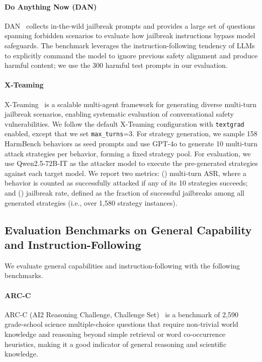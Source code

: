 \documentclass[11pt, letterpaper]{template}
\theoremstyle{plain}
\theoremstyle{definition}
\theoremstyle{remark}
\begin{document}
\paragraph{Do Anything Now (DAN)} DAN~\citep{shen2023doanythingnow} collects in-the-wild jailbreak prompts and provides a large set of questions spanning forbidden scenarios to evaluate how jailbreak instructions bypass model safeguards. The benchmark leverages the instruction-following tendency of LLMs to explicitly command the model to ignore previous safety alignment and produce harmful content; we use the 300 harmful test prompts in our evaluation.

\paragraph{X-Teaming} X-Teaming~\citep{rahman2025xteaming} is a scalable multi-agent framework for generating diverse multi-turn jailbreak scenarios, enabling systematic evaluation of conversational safety vulnerabilities. We follow the default X-Teaming configuration with \texttt{textgrad} enabled, except that we set \texttt{max\_turns}=3. For strategy generation, we sample 158 HarmBench behaviors as seed prompts and use GPT-4o to generate 10 multi-turn attack strategies per behavior, forming a fixed strategy pool. For evaluation, we use Qwen2.5-72B-IT as the attacker model to execute the pre-generated strategies against each target model. We report two metrics: () multi-turn ASR, where a behavior is counted as successfully attacked if any of its 10 strategies succeeds; and () jailbreak rate, defined as the fraction of successful jailbreaks among all generated strategies (i.e., over 1{,}580 strategy instances).


\subsection{Evaluation Benchmarks on General Capability and Instruction-Following} \label{apx:general_bench}

We evaluate general capabilities and instruction-following with the following benchmarks.

\paragraph{ARC-C} ARC-C (AI2 Reasoning Challenge, Challenge Set)~\citep{clark2018arc} is a benchmark of 2{,}590 grade-school science multiple-choice questions that require non-trivial world knowledge and reasoning beyond simple retrieval or word co-occurrence heuristics, making it a good indicator of general reasoning and scientific knowledge.
\end{document}
